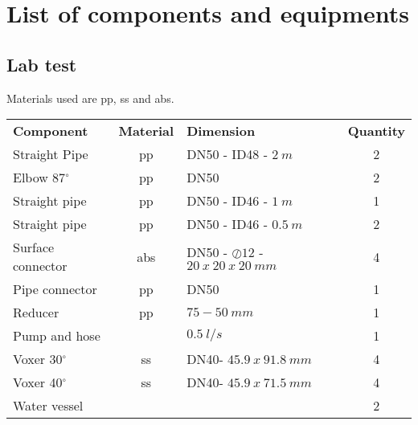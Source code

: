 \chapter{List of components and equipments}\label{appx:third}

\section{Lab test}
Materials used are \gls{pp}, \gls{ss} and \gls{abs}.

\begin{table}[h!]
\centering
\begin{tabular}{lclc}
\textbf{Component} & \textbf{Material} & \textbf{Dimension}           & \textbf{Quantity} \\
Straight Pipe     & \gls{pp}     & DN50 - ID48 - $2\ m$             & 2        \\
Elbow 87$^{\circ}$          & \gls{pp}      & DN50                         & 2        \\
Straight pipe     & \gls{pp}        & DN50 - ID46 - $1\ m$             & 1        \\
Straight pipe     & \gls{pp}         & DN50 - ID46 - $0.5\ m$           & 2        \\
Surface connector & \gls{abs}     & DN50 - $\oslash 12$ - $20\ x\ 20\ x\ 20\ mm$ & 4        \\
Pipe connector    & \gls{pp}         & DN50                         & 1        \\
Reducer           & \gls{pp}          & $75 - 50\ mm$                   & 1        \\
Pump and hose     &          & $0.5\ l/s$                      & 1        \\
Voxer 30$^{\circ}$           &     \gls{ss}     & DN40- $45.9\ x\ 91.8\ mm$       & 4        \\
Voxer 40$^{\circ}$           &    \gls{ss}      & DN40- $45.9\ x\ 71.5\ mm$       & 4        \\
Water vessel      &          &                              & 2        
\end{tabular}
\end{table}

